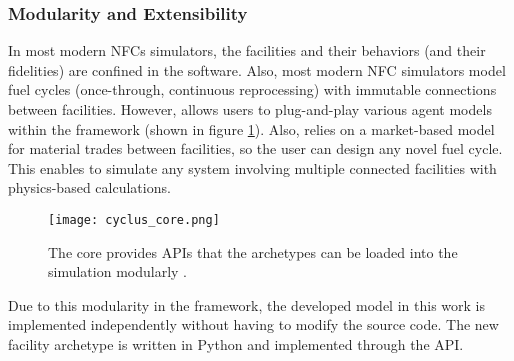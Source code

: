 \subsubsection{Modularity and Extensibility}

In most modern \glspl{NFC} simulators, the facilities and their
behaviors (and their fidelities) are confined in the software.
Also, most modern \gls{NFC} simulators model
fuel cycles (once-through, continuous reprocessing)
with immutable connections between facilities. However,
\Cyclus allows users to plug-and-play various agent models
within the \Cyclus framework (shown in figure \ref{fig:core}).
Also, \Cyclus relies on a market-based model
for material trades between facilities, so the user can design
any novel fuel cycle. This enables \Cyclus to simulate any system
involving multiple connected facilities with physics-based
calculations.

\begin{figure}[htbp!]
    \begin{center}
        \texttt{[image: cyclus\_core.png]}
    \end{center}
    \caption{The \Cyclus core provides APIs that the archetypes
            can be loaded into the simulation modularly
            \cite{huff_fundamental_2016}.}
    \label{fig:core}
\end{figure}

Due to this modularity in the \Cyclus framework, the developed
model in this work is implemented independently without
having to modify the \Cyclus source code. The new facility archetype
is written in Python and implemented through the \Cyclus API.
